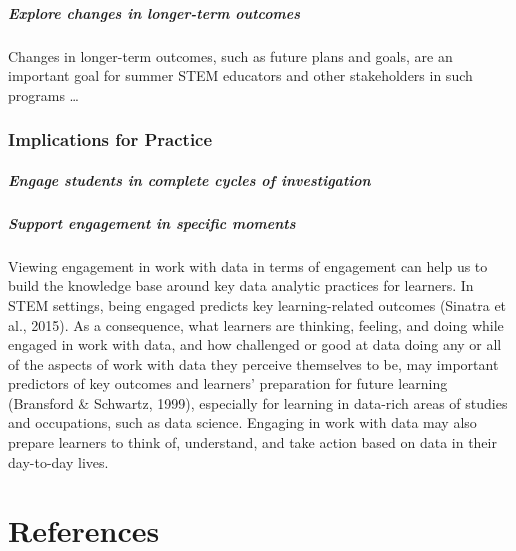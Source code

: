 \documentclass[]{msu-thesis}
\let\oldparagraph\paragraph
\renewcommand{\paragraph}[1]{\oldparagraph{#1}\mbox{}}
\theoremstyle{definition}
\theoremstyle{definition}
\theoremstyle{definition}
\theoremstyle{remark}
\begin{document}
\paragraph{Explore changes in longer-term
outcomes}\label{explore-changes-in-longer-term-outcomes}

Changes in longer-term outcomes, such as future plans and goals, are an
important goal for summer STEM educators and other stakeholders in such
programs \ldots{}

\subsection{Implications for Practice}\label{implications-for-practice}

\paragraph{Engage students in complete cycles of
investigation}\label{engage-students-in-complete-cycles-of-investigation}

\paragraph{Support engagement in specific
moments}\label{support-engagement-in-specific-moments}

Viewing engagement in work with data in terms of engagement can help us
to build the knowledge base around key data analytic practices for
learners. In STEM settings, being engaged predicts key learning-related
outcomes (Sinatra et al., 2015). As a consequence, what learners are
thinking, feeling, and doing while engaged in work with data, and how
challenged or good at data doing any or all of the aspects of work with
data they perceive themselves to be, may important predictors of key
outcomes and learners' preparation for future learning (Bransford \&
Schwartz, 1999), especially for learning in data-rich areas of studies
and occupations, such as data science. Engaging in work with data may
also prepare learners to think of, understand, and take action based on
data in their day-to-day lives.

\newpage

\chapter{References}\label{references}

\setlength{\parindent}{-0.5in} \setlength{\leftskip}{0.5in}
\end{document}
